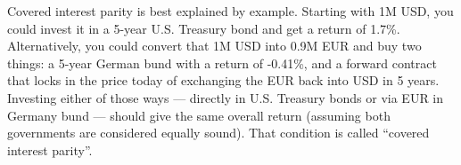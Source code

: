 




Covered interest parity is best explained by example.  Starting with 1M USD, you could invest it in a 5-year U.S. Treasury bond and get a return of 1.7\%.  Alternatively, you could convert that 1M USD into 0.9M EUR and buy two things: a 5-year German bund with a return of -0.41\%, and a forward contract that locks in the price today of exchanging the EUR back into USD in 5 years.  Investing either of those ways --- directly in U.S. Treasury bonds or via EUR in Germany bund --- should give the same overall return (assuming both governments are considered equally sound).  That condition is called ``covered interest parity''.





